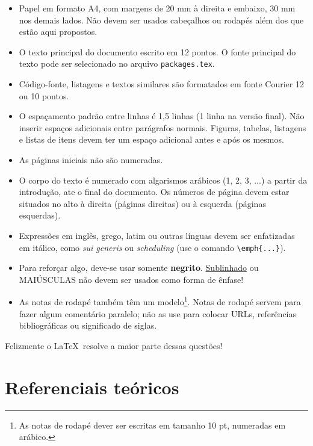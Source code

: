 \documentclass[12pt,]{04-class-files/abntex2}
\begin{document}
\begin{itemize}

\item Papel em formato A4, com margens de 20 mm à direita e embaixo, 30 mm nos demais lados. Não devem ser usados cabeçalhos ou rodapés além dos que estão aqui propostos.

\item O texto principal do documento escrito em 12 pontos. O fonte principal do texto pode ser selecionado no arquivo \verb#packages.tex#.

\item Código-fonte, listagens e textos similares são formatados em fonte Courier 12 ou 10 pontos.

\item O espaçamento padrão entre linhas é 1,5 linhas (1 linha na versão final). Não inserir espaços adicionais entre parágrafos normais. Figuras, tabelas, listagens e listas de itens devem ter um espaço adicional antes e após os mesmos.

\item As páginas iniciais não são numeradas.

\item O corpo do texto é numerado com algarismos arábicos (1, 2, 3, ...) a partir da introdução, ate o final do documento. Os números de página devem estar situados no alto à direita (páginas direitas) ou à esquerda (páginas esquerdas).

\item Expressões em inglês, grego, latim ou outras línguas devem ser enfatizadas em itálico, como \emph{sui generis} ou \emph{scheduling} (use o comando \verb#\emph{...}#).

\item Para reforçar algo, deve-se usar somente \textbf{negrito}. \underline{Sublinhado} ou MAIÚSCULAS não devem ser usados como forma de ênfase!

\item As notas de rodapé também têm um modelo\footnote{As notas de rodapé dever ser escritas em tamanho 10 pt, numeradas em arábico.}. Notas de rodapé servem para fazer algum comentário paralelo; não as use para colocar URLs, referências bibliográficas ou significado de siglas.

\end{itemize}

Felizmente o \LaTeX~resolve a maior parte dessas questões!

\part{Referenciais teóricos}
\end{document}
